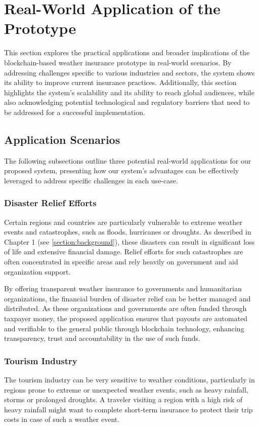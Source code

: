 \section{Real-World Application of the Prototype}\label{section:real_world_application_prototype}
This section explores the practical applications and broader implications of the blockchain-based weather insurance prototype in real-world scenarios. By addressing challenges specific to various industries and sectors, the system shows its ability to improve current insurance practices. Additionally, this section highlights the system's scalability and its ability to reach global audiences, while also acknowledging potential technological and regulatory barriers that need to be addressed for a successful implementation.

\subsection{Application Scenarios}
The following subsections outline three potential real-world applications for our proposed system, presenting how our system's advantages can be effectively leveraged to address specific challenges in each use-case.

\subsubsection{Disaster Relief Efforts}\label{disaster_relief}
Certain regions and countries are particularly vulnerable to extreme weather events and catastrophes, such as floods, hurricanes or droughts. As described in Chapter 1 (see \cref{section:background}), these disasters can result in significant loss of life and extensive financial damage. Relief efforts for such catastrophes are often concentrated in specific areas and rely heavily on government and aid organization support.

By offering transparent weather insurance to governments and humanitarian organizations, the financial burden of disaster relief can be better managed and distributed. As these organizations and governments are often funded through taxpayer money, the proposed application ensures that payouts are automated and verifiable to the general public through blockchain technology, enhancing transparency, trust and accountability in the use of such funds.

\subsubsection{Tourism Industry}\label{tourism_industry}
The tourism industry can be very sensitive to weather conditions, particularly in regions prone to extreme or unexpected weather events, such as heavy rainfall, storms or prolonged droughts. A traveler visiting a region with a high risk of heavy rainfall might want to complete short-term insurance to protect their trip costs in case of such a weather event.

